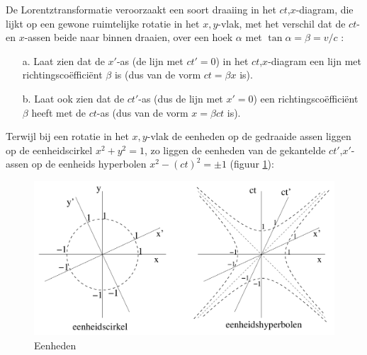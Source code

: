 De  Lorentztransformatie  veroorzaakt  een soort draaiing in het 
$ct$,$x$-diagram, die lijkt op een 
gewone  ruimtelijke  rotatie in het $x,y$-vlak, met het verschil dat 
de $ct$- en $x$-assen beide naar 
binnen draaien, over een hoek $\alpha$ met $\tan{\alpha} = \beta = v/c$ :

\begin{itemize}
\item [a.]
  Laat  zien  dat  de  $x'$-as  (de  lijn  met  $ct' = 0$)  in  het  
$ct$,$x$-diagram  een lijn met 
  richtingsco\"{e}ffici\"{e}nt $\beta$ is (dus van de vorm $ct = \beta x$ is).
\item [b.]
  Laat ook zien dat de $ct'$-as (dus de lijn met $x' = 0$) een
  richtingsco\"{e}ffici\"{e}nt $\beta$ heeft met de 
  $ct$-as (dus van de vorm $x = \beta ct$ is).
\end{itemize}

Terwijl  bij  een  rotatie  in  het  $x,y$-vlak  de  eenheden  op de 
gedraaide assen liggen op de eenheidscirkel  $x^{2} + y^{2} = 1$,  
zo liggen de eenheden van de gekantelde $ct'$,$x'$-assen op de eenheids 
hyperbolen $x^{2} - (ct)^{2}= \pm 1$ (figuur \ref{f:eenheid}):


\begin{figure}[ht]
\centering
\includegraphics[width=.8\textwidth]{oefeningen.pictures/oef_4/eenheid}
\caption{Eenheden}
\label{f:eenheid}
\end{figure}


